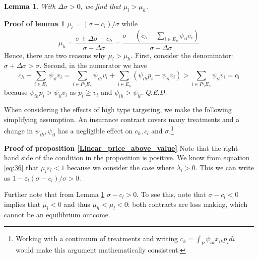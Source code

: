 \documentclass[a4paper,12pt]{article}
\newtheorem{lemma}{Lemma}
\newcommand{\qed}{\hspace*{\fill} {\em Q.E.D.}}
\begin{document}
\begin{lemma}
\label{Linear_pricing_profit_margins}
With \(\Delta \sigma > 0\), we find that \(\mu_l > \mu_h\).
\end{lemma}

\textbf{Proof of lemma \ref{Linear_pricing_profit_margins}}
\(\mu_l = (\sigma-c_l)/\sigma\) while
\begin{equation}
\label{eq:59}
\mu_h = \frac{\sigma+\Delta\sigma - c_h}{\sigma+\Delta\sigma}=\frac{\sigma-(c_h-\sum_{i \in E_h} \psi_{il} v_i)}{\sigma+\Delta\sigma}
\end{equation}
Hence, there are two reasons why \(\mu_l > \mu_h\). First, consider the denominator: \(\sigma+\Delta\sigma>\sigma\). Second, in the numerator we have
\begin{equation}
\label{eq:67}
c_h-\sum_{i \in E_h} \psi_{il} v_i = \sum_{i \in P \setminus E_h} \psi_{ih}v_i + \sum_{i \in E_h} (\psi_{ih}p_i-\psi_{il}v_i) > \sum_{i \in P \setminus E_h} \psi_{il} v_i = c_l
\end{equation}
because \(\psi_{ih}p_i > \psi_{il}v_i\) as \(p_i \geq v_i\) and \(\psi_{ih}>\psi_{il}\). 
 \qed



When considering the effects of high type targeting, we make the following simplifying assumption. An insurance contract covers many treatments and a change in \(\psi_{ih},\psi_{il}\) has a negligible effect on \(c_h, c_l\) and \(\sigma\).\footnote{Working with a continuum of treatments and writing \(c_k = \int_P \psi_{ik}x_{ik}p_idi\) would make this argument mathematically consistent.}

\textbf{Proof of proposition \ref{Linear_price_above_value}}
Note that the right hand side of the condition in the proposition is positive. We know from equation \eqref{eq:36} that \(\mu_l \varepsilon_l<1\) because we consider the case where \(\lambda_l > 0\). This we can write as \(1-\varepsilon_l (\sigma-c_l)/\sigma >0\).

Further note that from Lemma \ref{Linear_pricing_profit_margins} \(\sigma-c_l >0\). To see this, note that \(\sigma-c_l < 0\) implies that \(\mu_l < 0\) and thus \(\mu_h < \mu_l < 0\): both contracts are loss making, which cannot be an equilibrium outcome.
\end{document}
